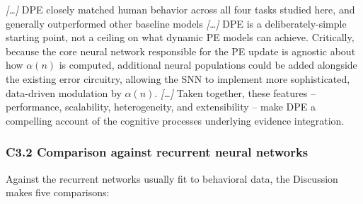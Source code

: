 \begin{ms}
\textit{[\ldots]} DPE closely matched human behavior across all four tasks studied here, and generally outperformed other baseline models \textit{[\ldots]} DPE is a deliberately-simple starting point, not a ceiling on what dynamic PE models can achieve. Critically, because the core neural network responsible for the PE update is agnostic about how $\alpha(n)$ is computed, additional neural populations could be added alongside the existing error circuitry, allowing the SNN to implement more sophisticated, data-driven modulation by $\alpha(n)$. \textit{[\ldots]} Taken together, these features -- performance, scalability, heterogeneity, and extensibility -- make DPE a compelling account of the cognitive processes underlying evidence integration.
\end{ms}

\subsubsection*{C3.2 Comparison against recurrent neural networks}

Against the recurrent networks usually fit to behavioral data, the Discussion makes five comparisons:

